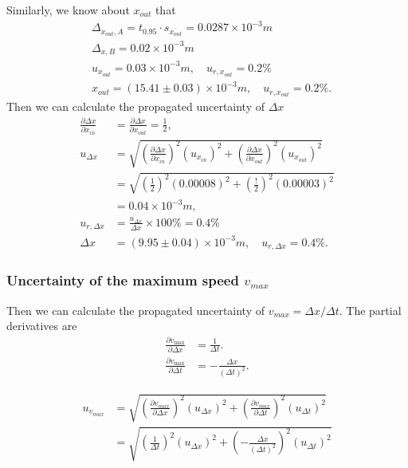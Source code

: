 Similarly, we know about $x_{out}$ that
\[
\begin{split}
    &\Delta_{x_{out},A}=t_{0.95}\cdot s_{\overline{x_{out}}}=0.0287\times10^{-3}m\\
    &\Delta_{x,B}=0.02\times10^{-3}m\\
    &u_{x_{out}}=0.03\times10^{-3}m,\quad
    u_{r,x_{out}}=0.2 \%    \\
    &x_{out}=(15.41\pm 0.03) \times10^{-3}m,\quad u_{r,x_{out}}=0.2\%.
\end{split}
\]
Then we can calculate the propagated uncertainty of $\Delta x$
\[
\begin{split}
    \frac{\partial\Delta x}{\partial x_{in}}&=\frac{\partial\Delta x}{\partial x_{out}}=\frac{1}{2},\\
    u_{\Delta x}&=\sqrt{(\frac{\partial\Delta x}{\partial x_{in}})^2(u_{x_{in}})^2+(\frac{\partial\Delta x}{\partial x_{out}})^2(u_{x_{out}})^2}\\ 
    &=\sqrt{(\frac{1}{2})^2(0.00008)^2+(\frac{!}{2})^2(0.00003)^2}\\
    &=0.04\times10^{-3}m,\\
    u_{r,\Delta x}&=\frac{u_{\Delta x}}{\Delta x}\times100\%=0.4\%\\[0.4cm]
    \Delta x&=(9.95\pm0.04)\times10^{-3}m,\quad u_{r,\Delta x}=0.4\%.
\end{split}
\]

\subsubsection{Uncertainty of the maximum speed $v_{max}$}
Then we can calculate the propagated uncertainty of $v_{max}=\Delta x/\Delta t$. The partial derivatives are
\[
\begin{split}
    \frac{\partial v_{\max}}{\partial \Delta x}&=\frac{1}{\Delta t}.\\[0.5cm]
    \frac{\partial v_{\max}}{\partial \Delta t}&=-\frac{\Delta x}{(\Delta t)^2}.    
\end{split}    
\]

\[
\begin{split}
    u_{v_{max}}&=\sqrt{(\frac{\partial v_{max}}{\partial \Delta x})^2(u_{\Delta x})^2+(\frac{\partial v_{max}}{\partial \Delta t})^2(u_{\Delta t})^2}     \\
    &=\sqrt{(\frac{1}{\Delta t})^2(u_{\Delta x})^2+(-\frac{\Delta x}{(\Delta t)^2})^2(u_{\Delta t})^2}
\end{split}
\]
